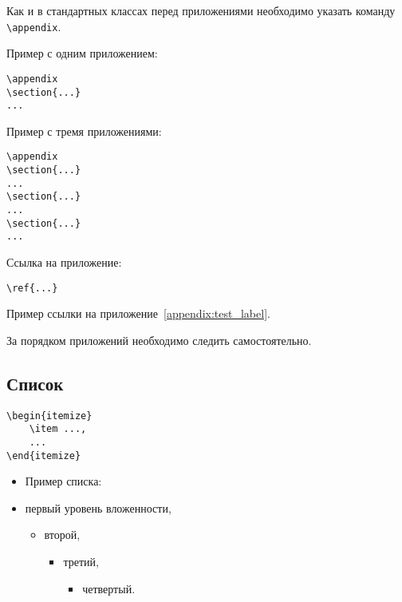 \documentclass[14pt, a4paper, titlepage]{extarticle}
\renewcommand{\thesection}{\Asbuk{section}}
\let\oldsec\section
\renewcommand{\section}{
        \clearpage
        \phantomsection
        \refstepcounter{section}
        \addcontentsline{toc}{section}{\appendixname~\thesection}
        \oldsec*} %
\begin{document}
Как и в стандартных классах перед приложениями необходимо указать команду \verb"\appendix".

Пример с одним приложением:
\begin{verbatim}
\appendix
\section{...}
...
\end{verbatim}

Пример с тремя приложениями:
\begin{verbatim}
\appendix
\section{...}
...
\section{...}
...
\section{...}
...
\end{verbatim}

Ссылка на приложение:
\begin{verbatim}
\ref{...}
\end{verbatim}

Пример ссылки на приложение~\ref{appendix:test_label}.

За порядком приложений необходимо следить самостоятельно.

\subsection{Список}

\begin{verbatim}
\begin{itemize}
    \item ...,
    ...
\end{itemize}
\end{verbatim}

\begin{itemize}
    \item[] Пример списка:
    \item первый уровень вложенности,
    \begin{itemize}
        \item второй,
        \begin{itemize}
            \item третий,
            \begin{itemize}
                \item четвертый.
            \end{itemize}
        \end{itemize}
    \end{itemize}
\end{itemize}
\end{document}
